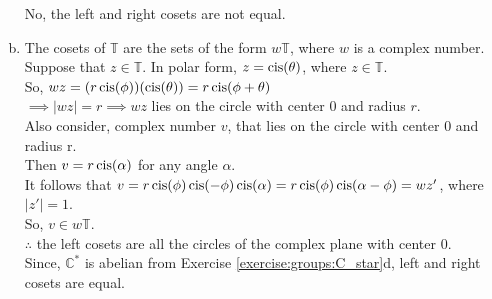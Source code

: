 \begin{enumerate}[(a)]
No, the left and right cosets are not equal.
\\

\item
The cosets of ${\mathbb T}$ are the sets of the form $w{\mathbb T}$, where $w$ is a complex number.
\\
Suppose that $z \in {\mathbb T}$.  In polar form, $z = \operatorname{cis} (\theta)$, where $z \in {\mathbb T}$.
\\
So, $wz =( r \operatorname{cis} (\phi))(\operatorname{cis} (\theta)) = r \operatorname{cis} (\phi + \theta)$
\\
$\implies |wz| = r \implies wz$ lies on the circle with center 0 and radius $r$.
\\
Also consider, complex number $v$, that lies on the circle with center 0 and radius r. 
\\
Then $v = r \operatorname{cis}(\alpha)$ for any angle $\alpha$.
\\
It follows that $v = r \operatorname{cis}(\phi) \operatorname{cis}(-\phi) \operatorname{cis}(\alpha) = r \operatorname{cis}(\phi) \operatorname{cis}(\alpha - \phi) = wz'$, where $|z'| = 1$.
\\
So, $v \in w{\mathbb T}$.
\\
$\therefore$ the left cosets are all the circles of the complex plane with center 0.
\\
Since, ${\mathbb C}^\ast$ is abelian from Exercise \ref{exercise:groups:C_star}d, left and right cosets are equal.
\end{enumerate}

